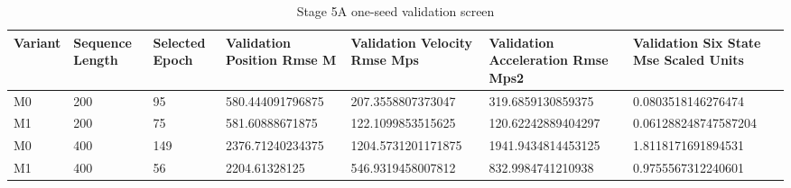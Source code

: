 \begin{table}[t]
\centering
\caption{Stage 5A one-seed validation screen}
\label{tab:stage5a}
\scriptsize
\begin{tabular}{lllllll}
\hline
Variant & Sequence Length & Selected Epoch & Validation Position Rmse M & Validation Velocity Rmse Mps & Validation Acceleration Rmse Mps2 & Validation Six State Mse Scaled Units \\
\hline
M0 & 200 & 95 & 580.444091796875 & 207.3558807373047 & 319.6859130859375 & 0.0803518146276474 \\
M1 & 200 & 75 & 581.60888671875 & 122.1099853515625 & 120.62242889404297 & 0.061288248747587204 \\
M0 & 400 & 149 & 2376.71240234375 & 1204.5731201171875 & 1941.9434814453125 & 1.8118171691894531 \\
M1 & 400 & 56 & 2204.61328125 & 546.9319458007812 & 832.9984741210938 & 0.9755567312240601 \\
\hline
\end{tabular}
\end{table}
